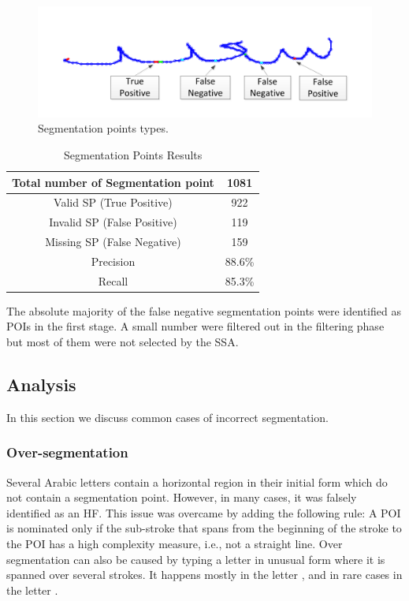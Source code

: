 \documentclass[10pt, conference, compsocconf]{IEEEtran}
\begin{document}
\begin{figure}
\centering
\includegraphics[width=0.9\columnwidth]{./figures/sp_types}
\caption{Segmentation points types.}
\label{fig:sp_types}
\end{figure}

\begin{table}[h]
\caption{Segmentation Points Results}
\begin{tabular}{ | c | c | }
  \hline
  Total number of Segmentation point & 1081 \\
  \hline
  Valid SP (True Positive) & 922 \\
  \hline
  Invalid SP (False Positive) & 119 \\
  \hline
  Missing SP (False Negative) & 159 \\
  \hline                                    
  Precision & 88.6\% \\ 
 \hline
  Recall &  85.3\% \\ 
 \hline
\end{tabular}
\centering
\label{table:sp_results} 
\end{table}

The absolute majority of the false negative segmentation points were identified as POIs in the first stage. A small number were filtered out in the filtering phase but most of them were not selected by the SSA.

\subsection{Analysis}
In this section we discuss common cases of incorrect segmentation.
\subsubsection{Over-segmentation}
Several Arabic letters contain a horizontal region in their initial form which do not contain a segmentation point. 
However, in many cases, it was falsely identified as an HF. 
This issue was overcame by adding the following rule: A POI is nominated only if the sub-stroke that spans from the beginning of the stroke to the POI has a high complexity measure, i.e., not a straight line. 
Over segmentation can also be caused by typing a letter in unusual form where it is spanned over several strokes. 
It happens mostly in the letter ,  and in rare cases in the letter .
\end{document}
